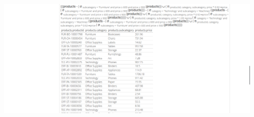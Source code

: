 \documentclass[12pt,a4paper]{article}
\begin{document}
\begin{enumerate}
\begin{enumerate}
				\includegraphics[scale=0.4]{assets/mantenimiento_datos-e2.png}
		\end{enumerate}
\end{enumerate}
\end{document}
